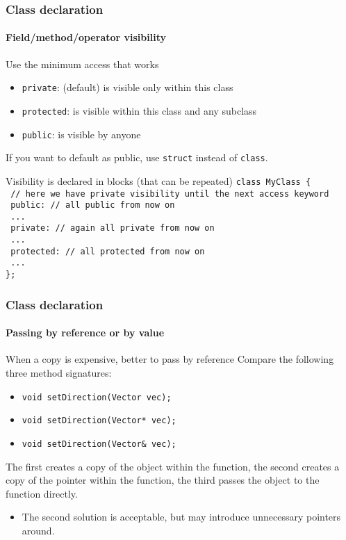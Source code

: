 \begin{frame}[fragile]
\frametitle{Class declaration}
\framesubtitle{Field/method/operator visibility}

\begin{block}{Use the minimum access that works}
\begin{itemize}
\item \texttt{private}: (default) is visible only within this class
\item \texttt{protected}: is visible within this class and any subclass
\item \texttt{public}: is visible by anyone 
\end{itemize}
If you want to default as public, use \texttt{struct} instead of \texttt{class}.
\end{block}
\pause
\begin{block}{Visibility is declared in blocks (that can be repeated)}
{ \scriptsize
\texttt{class MyClass \{ } \\
\texttt{  // here we have private visibility until the next access keyword } \\
\texttt{  public: // all public from now on }  \\ 
\texttt{    ... } \\
\texttt{  private: // again all private from now on } \\
\texttt{    ...} \\
\texttt{  protected: // all protected from now on } \\
\texttt{    ...} \\
\texttt{\}; } 
}
\end{block}

\end{frame}

\begin{frame}
\frametitle{Class declaration}
\framesubtitle{Passing by reference or by value}

\begin{block}{When a copy is expensive, better to pass by reference}
Compare the following three method signatures:
\begin{itemize}
\item \texttt{void setDirection(Vector vec); }
\item \texttt{void setDirection(Vector* vec); }
\item \texttt{void setDirection(Vector\& vec); }
\end{itemize}
The first creates a copy of the object within the function, the second creates a copy of the pointer within the function, the third passes the object to the function directly.
\begin{itemize}
\item The second solution is acceptable, but may introduce unnecessary pointers around.
\end{itemize}
\end{block}

\end{frame}

